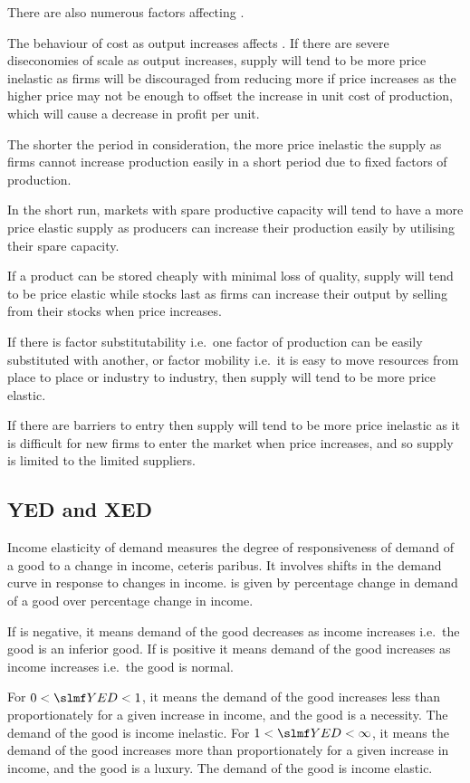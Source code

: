 \documentclass[Economics.tex]{subfiles}
\begin{document}
There are also numerous factors affecting \PE[S].

The behaviour of cost as output increases affects \PE[S]. If there are severe diseconomies of scale as output increases, supply will tend to be more price inelastic as firms will be discouraged from reducing more if price increases as the higher price may not be enough to offset the increase in unit cost of production, which will cause a decrease in profit per unit.

The shorter the period in consideration, the more price inelastic the supply as firms cannot increase production easily in a short period due to fixed factors of production.

In the short run, markets with spare productive capacity will tend to have a more price elastic supply as producers can increase their production easily by utilising their spare capacity.

If a product can be stored cheaply with minimal loss of quality, supply will tend to be price elastic while stocks last as firms can increase their output by selling from their stocks when price increases.

If there is factor substitutability i.e.\ one factor of production can be easily substituted with another, or factor mobility i.e.\ it is easy to move resources from place to place or industry to industry, then supply will tend to be more price elastic.

If there are barriers to entry then supply will tend to be more price inelastic as it is difficult for new firms to enter the market when price increases, and so supply is limited to the limited suppliers.
\subsection{YED and XED}
Income elasticity of demand measures the degree of responsiveness of demand of a good to a change in income, ceteris paribus. It involves shifts in the demand curve in response to changes in income. \YED{} is given by percentage change in demand of a good over percentage change in income.

If \YED{} is negative, it means demand of the good decreases as income increases i.e.\ the good is an inferior good. If \YED{} is positive it means demand of the good increases as income increases i.e.\ the good is normal.

For \(0<\YED<1\), it means the demand of the good increases less than proportionately for a given increase in income, and the good is a necessity. The demand of the good is income inelastic. For \(1<\YED<\infty\), it means the demand of the good increases more than proportionately for a given increase in income, and the good is a luxury. The demand of the good is income elastic.
\end{document}
